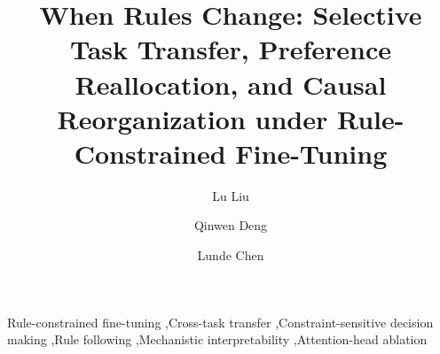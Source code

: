 ﻿\documentclass[preprint,12pt]{elsarticle}
\begin{document}
\begin{frontmatter}

\title{When Rules Change: Selective Task Transfer, Preference Reallocation, and Causal Reorganization under Rule-Constrained Fine-Tuning}

\author[aff1,aff2]{Lu Liu}

\author[aff1]{Qinwen Deng}

\author[aff1]{Lunde Chen}


\address[aff1]{Sino-European School of Technology, Shanghai University, Shanghai, China}

\address[aff2]{Department of Engineering, Faculty of Natural, Mathematical \& Engineering Sciences, King's College London, London, United Kingdom}



\begin{keyword}
Rule-constrained fine-tuning
\sep Cross-task transfer
\sep Constraint-sensitive decision making
\sep Rule following
\sep Mechanistic interpretability
\sep Attention-head ablation
\end{keyword}

\end{frontmatter}











\end{document}
